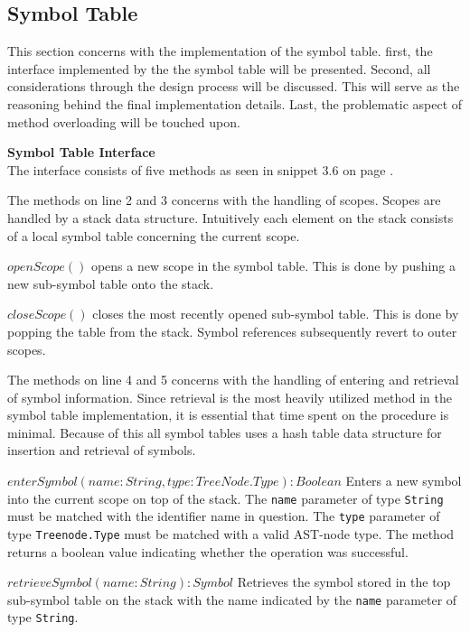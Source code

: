 \subsection{Symbol Table}
This section concerns with the implementation of the symbol table. 
first, the interface implemented by the the symbol table will be presented.
Second, all considerations through the design process will be discussed.
This will serve as the reasoning behind the final implementation details.
Last, the problematic aspect of method overloading will be touched upon.

\textbf{Symbol Table Interface}\\
The interface consists of five methods as seen in snippet 3.6 on page \pageref{lis:STInterface}.

The methods on line 2 and 3 concerns with the handling of scopes.
Scopes are handled by a stack data structure.
Intuitively each element on the stack consists of a local symbol table concerning the current scope.

$openScope()$ opens a new scope in the symbol table.
This is done by pushing a new sub-symbol table onto the stack.

$closeScope()$ closes the most recently opened sub-symbol table.
This is done by popping the table from the stack.
Symbol references subsequently revert to outer scopes.

The methods on line 4 and 5 concerns with the handling of entering and retrieval of symbol information.
Since retrieval is the most heavily utilized method in the symbol table implementation, it is essential that time spent on the procedure is minimal.
Because of this all symbol tables uses a hash table data structure for insertion and retrieval of symbols. 

$enterSymbol(name: String, type: TreeNode.Type): Boolean$ Enters a new symbol into the current scope on top of the stack.
The \texttt{name} parameter of type \texttt{String} must be matched with the identifier name in question.
The \texttt{type} parameter of type \texttt{Treenode.Type} must be matched with a valid AST-node type.
The method returns a boolean value indicating whether the operation was successful.

$retrieveSymbol(name: String): Symbol$ Retrieves the symbol stored in the top sub-symbol table on the stack with the name indicated by the \texttt{name} parameter of type \texttt{String}.

